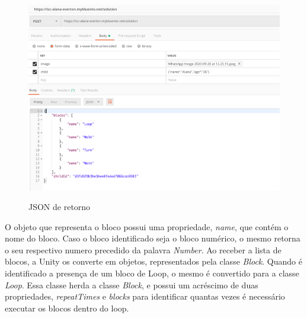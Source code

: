     \begin{figure}[H]
        \caption{JSON de retorno}
        \centering
        \includegraphics[width=\linewidth]{Imagens/Cap4/json_retorno.png}
        \label{figura:json_retorno}
    \end{figure}
    
    O objeto que representa o bloco possui uma propriedade, \textit{name}, que contém o nome do bloco. Caso o bloco identificado seja o bloco numérico, o mesmo retorna o seu respectivo numero precedido da palavra \textit{Number}.
    Ao receber a lista de blocos, a Unity os converte em objetos, representados pela classe \textit{Block}. Quando é identificado a presença de um bloco de Loop, o mesmo é convertido para a classe \textit{Loop}. Essa classe herda a classe \textit{Block}, e possui um acréscimo de duas propriedades, \textit{repeatTimes} e \textit{blocks} para identificar quantas vezes é necessário executar os blocos dentro do loop.
    
    
    
